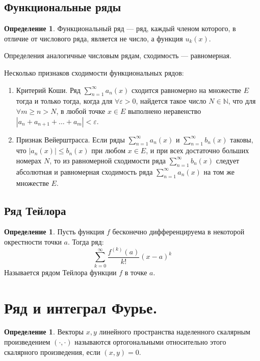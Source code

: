 \documentclass[12pt]{report}
\theoremstyle{definition}
\newtheorem{definition}[theorem]{Определение}
\newcommand{\N}{\mathbb N}
\begin{document}
\subsection{Функциональные ряды}
\begin{definition}
Функциональный ряд --- ряд, каждый членом которого, в отличие от числового ряда,
является не число, а функция $u_k(x)$.
\end{definition}

Определения аналогичные числовым рядам, сходимость --- равномерная.

Несколько признаков сходимости функциональных рядов:
\begin{enumerate}
\item Критерий Коши.
  Ряд $\sum\limits_{n=1}^\infty a_n(x)$ сходится равномерно на множестве $E$ тогда
  и только тогда, когда для $\forall \varepsilon > 0$, найдется такое число
  $N \in \N$, что для $\forall m \ge n > N$, в любой точке $x \in E$ выполнено
  неравенство $|a_n + a_{n + 1} + \dots + a_m| < \varepsilon$.
\item Признак Вейерштрасса.
  Если ряды $\sum\limits_{n=1}^\infty a_n(x)$ и $\sum\limits_{n=1}^\infty b_n(x)$
  таковы, что $|a_n(x)| \le b_n(x)$ при любом $x\in E$, и при всех достаточно больших
  номерах $N$, то из равномерной сходимости ряда $\sum\limits_{n=1}^\infty b_n(x)$
  следует абсолютная и равномерная сходимость ряда $\sum\limits_{n=1}^\infty a_n(x)$
  на том же множестве $E$.
\end{enumerate}

\subsection{Ряд Тейлора}
\begin{definition}
Пусть функция $f$ бесконечно дифференцируема в некоторой окрестности
точки $a$. Тогда ряд:
$$
\sum\limits_{k=0}^\infty \dfrac{f^{(k)}(a)}{k!} (x - a)^k
$$
Называется рядом Тейлора функции $f$ в точке $a$.
\end{definition}


\section{Ряд и интеграл Фурье.}
\begin{definition}
Векторы $x, y$ линейного пространства наделенного скалярным произведением $(\cdot,\cdot)$
называются ортогональными относительно этого скалярного произведения, если
$(x, y) = 0$.
\end{definition}
\end{document}
